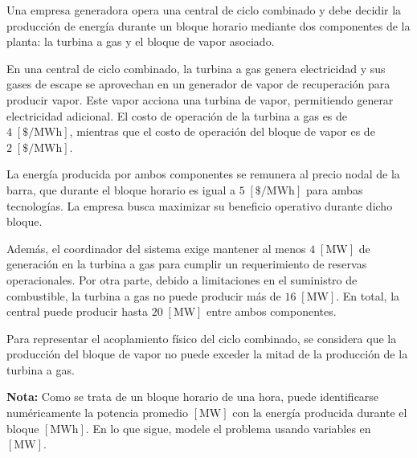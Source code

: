 Una empresa generadora opera una central de ciclo combinado y debe decidir la
producción de energía durante un bloque horario mediante dos componentes de la
planta: la turbina a gas y el bloque de vapor asociado.

En una central de ciclo combinado, la turbina a gas genera electricidad y sus
gases de escape se aprovechan en un generador de vapor de recuperación para
producir vapor. Este vapor acciona una turbina de vapor, permitiendo generar
electricidad adicional. El costo de operación de la turbina a gas es de
$4\;[\$/\mathrm{MWh}]$, mientras que el costo de operación del bloque de vapor
es de $2\;[\$/\mathrm{MWh}]$.

La energía producida por ambos componentes se remunera al precio nodal de la
barra, que durante el bloque horario es igual a $5\;[\$/\mathrm{MWh}]$ para
ambas tecnologías. La empresa busca maximizar su beneficio operativo durante
dicho bloque.

Además, el coordinador del sistema exige mantener al menos $4\;[\mathrm{MW}]$
de generación en la turbina a gas para cumplir un requerimiento de reservas
operacionales. Por otra parte, debido a limitaciones en el suministro de
combustible, la turbina a gas no puede producir más de $16\;[\mathrm{MW}]$.
En total, la central puede producir hasta $20\;[\mathrm{MW}]$ entre ambos
componentes.

Para representar el acoplamiento físico del ciclo combinado, se considera que
la producción del bloque de vapor no puede exceder la mitad de la producción de
la turbina a gas.

\medskip
\noindent
\textbf{Nota:} Como se trata de un bloque horario de una hora, puede
identificarse numéricamente la potencia promedio $[\mathrm{MW}]$ con la energía
producida durante el bloque $[\mathrm{MWh}]$. En lo que sigue, modele el
problema usando variables en $[\mathrm{MW}]$.

